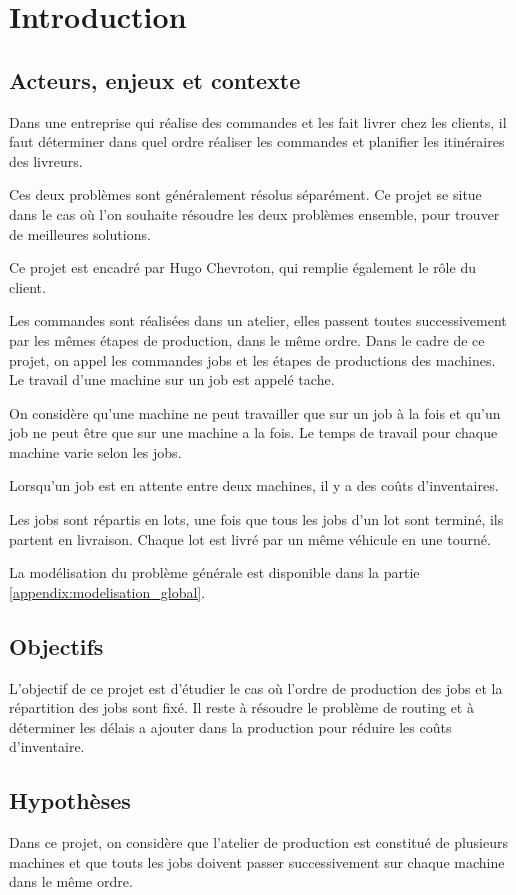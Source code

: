 \chapter{Introduction}

\section{Acteurs, enjeux et contexte}
Dans une entreprise qui réalise des commandes et les fait livrer chez les clients, il faut déterminer dans quel ordre réaliser les commandes et planifier les itinéraires des livreurs.

Ces deux problèmes sont généralement résolus séparément.
Ce projet se situe dans le cas où l'on souhaite résoudre les deux problèmes ensemble, pour trouver de meilleures solutions.

Ce projet est encadré par Hugo Chevroton, qui remplie également le rôle du client.

Les commandes sont réalisées dans un atelier, elles passent toutes successivement par les mêmes étapes de production, dans le même ordre.
Dans le cadre de ce projet, on appel les commandes jobs et les étapes de productions des machines.
Le travail d'une machine sur un job est appelé tache.

On considère qu'une machine ne peut travailler que sur un job à la fois et qu'un job ne peut être que sur une machine a la fois.
Le temps de travail pour chaque machine varie selon les jobs.

Lorsqu'un job est en attente entre deux machines, il y a des coûts d'inventaires.

Les jobs sont répartis en lots, une fois que tous les jobs d'un lot sont terminé, ils partent en livraison.
Chaque lot est livré par un même véhicule en une tourné.

La modélisation du problème générale est disponible dans la partie \autoref{appendix:modelisation_global}.

\section{Objectifs}
L'objectif de ce projet est d'étudier le cas où l'ordre de production des jobs et la répartition des jobs sont fixé.
Il reste à résoudre le problème de routing et à déterminer les délais a ajouter dans la production pour réduire les coûts d'inventaire.


\section{Hypothèses}
Dans ce projet, on considère que l'atelier de production est constitué de plusieurs machines et que touts les jobs doivent passer successivement sur chaque machine dans le même ordre.

